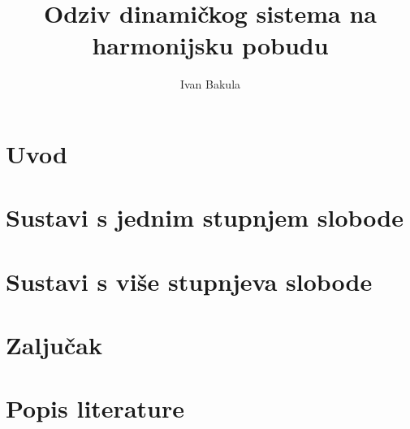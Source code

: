 \documentclass{rgn}
\author{Ivan Bakula}
\title{Odziv dinamičkog sistema na harmonijsku pobudu}
\begin{document}
\maketitle
%
\begin{titlepage}
    
\end{titlepage}
\begin{titlepage}
    
\end{titlepage}

\frontmatter
\tableofcontents
\newpage
\listoftables
\newpage
\listoffigures
\newpage

\mainmatter
\chapter{Uvod}
    
\chapter{Sustavi s jednim stupnjem slobode}
    
    \newpage
    
    \newpage
    
    
    \newpage
    
    \newpage
    
    \newpage
    
    \newpage
    
    \newpage
    
    \newpage
    
    \newpage
    
    \newpage
\chapter{Sustavi s više stupnjeva slobode}
    
    \newpage
    
    \newpage
    
    \newpage
    
    \newpage
    
    \newpage
    
\chapter{Zaljučak}
    

\chapter{Popis literature}
    
\end{document}

